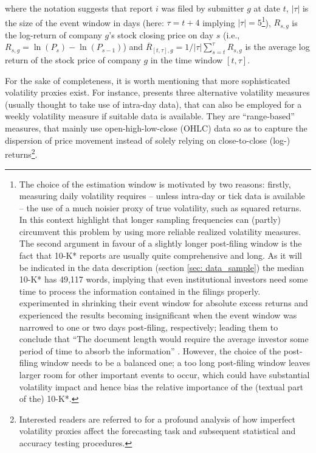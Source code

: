 where the notation suggests that report $i$ was filed by submitter $g$ at date $t$, $|\tau |$ is the size of the event window in days (here: $\tau = t + 4$ implying $|\tau | = 5$\footnote{The choice of the estimation window is motivated by two reasons: firstly, measuring daily volatility requires -- unless intra-day or tick data is available -- the use of a much noisier proxy of true volatility, such as squared returns. In this context \textcite[240]{EnglePatton_2001} highlight that longer sampling frequencies can (partly) circumvent this problem by using more reliable realized volatility measures. The second argument in favour of a slightly longer post-filing window is the fact that 10-K* reports are usually quite comprehensive and long. As it will be indicated in the data description (section \ref{sec: data_sample}) the median 10-K* has 49,117 words, implying that even institutional investors need some time to process the information contained in the filings properly. \textcite{Loughran2011} experimented in shrinking their event window for absolute excess returns and experienced the results becoming insignificant when the event window was narrowed to one or two days post-filing, respectively; leading them to conclude that \enquote{The document length would require the average investor some period of time to absorb the information} \parencite[53]{Loughran2011}. However, the choice of the post-filing window needs to be a balanced one; a too long post-filing window leaves larger room for other important events to occur, which could have substantial volatility impact and hence bias the relative importance of the (textual part of the) 10-K*.}), $R_{s,g}$ is the log-return of company $g$’s stock closing price on day $s$ (i.e., $R_{s,g} = \ln (P_s) - \ln (P_{s-1})$) and $\overline{R}_{[t,\tau],g} = 1/|\tau | \sum_{s = t}^{\tau} R_{s,g}$ is the average log return of the stock price of company $g$ in the time window $[t,\tau]$.

For the sake of completeness, it is worth mentioning that more sophisticated volatility proxies exist. For instance, \textcite{Raviv_online} presents three alternative volatility measures (usually thought to take use of intra-day data), that can also be employed for a weekly volatility measure if suitable data is available. They are \enquote{range-based} measures, that mainly use open-high-low-close (OHLC) data so as to capture the dispersion of price movement instead of solely relying on close-to-close (log-) returns\footnote{Interested readers are referred to \textcite{PattonSheppard2009} for a profound analysis of how imperfect volatility proxies affect the forecasting task and subsequent statistical and accuracy testing procedures.}. 

\clearpage